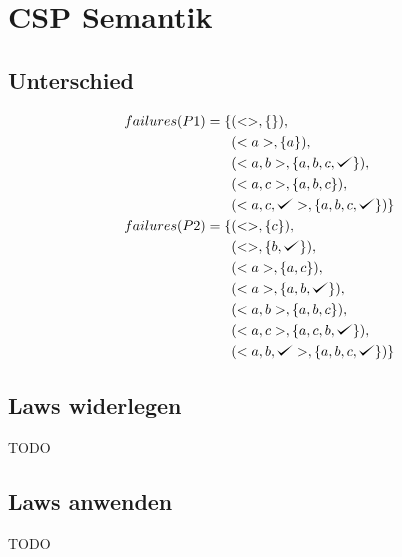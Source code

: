 \documentclass[10pt,a4paper,fleqn]{article}
\def\checkmark{\tikz\fill[scale=0.4](0,.35) -- (.25,0) -- (1,.7) -- (.25,.15) -- cycle;}
\begin{document}
  \renewcommand{\labelenumi}{(\alph{enumi})}
  \renewcommand\headrule{\vspace{+2pt}\hrule}
  \newcommand{\solved}{\[\hfill\Box\]}
  \setlength{\headheight}{2.5\baselineskip}
  \pagestyle{fancyplain}

  \rhead{\emph{}\\ \today}

\section{CSP Semantik}
\subsection{Unterschied}

\begin{equation*}
\begin{split}
failures(P1) = \{&(<>,\{\}),\\
                 &(<a>, \{a\}),\\
                 &(<a,b>, \{a,b,c, \checkmark\}),\\
                 &(<a,c>,\{a,b,c\}),\\ &(<a,c,\checkmark>, \{a,b,c, \checkmark\})\}\\
failures(P2) = \{&(<>,\{c\}),\\
                 &(<>, \{b, \checkmark\}),\\ &(<a>, \{a,c\}),\\
                 &(<a>, \{a,b,\checkmark\}),\\
                 &(<a,b>, \{a,b,c\}), \\&(<a,c>, \{a,c,b,\checkmark\}),\\ &(<a,b,\checkmark>, \{a,b,c,\checkmark\})\}
\end{split}
\end{equation*}

\subsection{Laws widerlegen}
TODO
\subsection{Laws anwenden}
TODO
\end{document}

